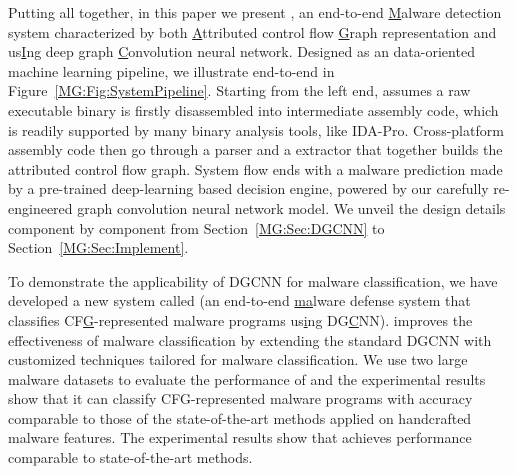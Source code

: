 Putting all together, in this paper we present \sysname,
an end-to-end \underline{M}alware detection system characterized by both \underline{A}ttributed control flow \underline{G}raph representation and
us\underline{I}ng deep graph \underline{C}onvolution neural network.
Designed as an data-oriented machine learning pipeline, we illustrate \sysname end-to-end in Figure~\ref{MG:Fig:SystemPipeline}.
Starting from the left end, \sysname assumes a raw executable binary is firstly disassembled into intermediate assembly code,
which is readily supported by many binary analysis tools, like IDA-Pro.
Cross-platform assembly code then go through a parser and a extractor that together builds the attributed control flow graph.
System flow ends with a malware prediction made by a pre-trained deep-learning based decision engine,
powered by our carefully re-engineered graph convolution neural network model.
We unveil the design details component by component from Section~\ref{MG:Sec:DGCNN} to Section~\ref{MG:Sec:Implement}.
\fi

To demonstrate the applicability of DGCNN for malware classification,
we have developed a new system called \sysname (an end-to-end \underline{ma}lware defense system that classifies CF\underline{G}-represented malware programs us\underline{i}ng DG\underline{C}NN).
\sysname improves the effectiveness of malware classification by extending the standard DGCNN with customized techniques tailored for malware classification.
We use two large malware datasets to evaluate the performance of \sysname and the experimental results show that it can classify CFG-represented malware programs with accuracy comparable to those of the state-of-the-art methods applied on handcrafted malware features.
The experimental results show that \sysname achieves performance comparable to state-of-the-art methods.


